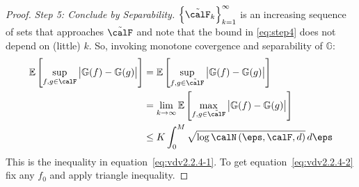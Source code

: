 \begin{proof}
	\emph{Step 5: Conclude by Separability.} \(\left\{\tilde\calF_k\right\}_{k=1}^\infty\) is an increasing sequence of sets that approaches \(\tilde\calF\) and note that the bound in \eqref{eq:step4} does not depend on (little) \(k\). So, invoking monotone covergence and separability of \(\mathbb{G}\):
	\begin{align*}
		\E\left[\sup_{f,g\in\calF}\left|\mathbb{G}(f)-\mathbb{G}(g)\right|\right]
		&= \E\left[\sup_{f,g\in\tilde\calF}\left|\mathbb{G}(f)-\mathbb{G}(g)\right|\right] \\
		&= \lim_{k\to\infty}\E\left[\max_{f,g\in\tilde\calF}\left|\mathbb{G}(f)-\mathbb{G}(g)\right|\right] \\
		&\leq K \int_{0}^{M} \sqrt{\log\calN\left(\eps,\calF,d\right)}\,d\eps 
	\end{align*}
	This is the inequality in equation~\eqref{eq:vdv2.2.4-1}. To get equation~\eqref{eq:vdv2.2.4-2} fix any \(f_0\) and apply triangle inequality.
\end{proof}

\begin{remark}
    \label{rem:}
	
\end{remark}
